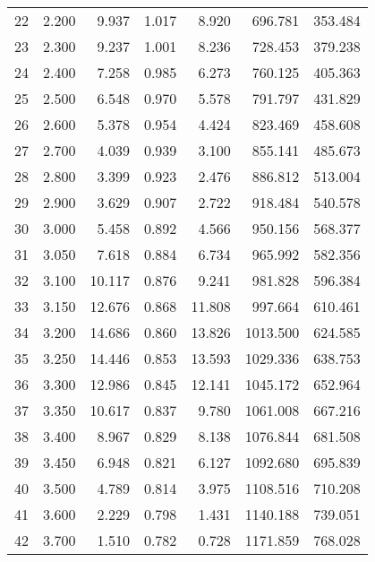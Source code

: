 \begin{table}[H]
\begin{tabular}{rrrrrrr}
22 & 2.200 &   9.937 &  1.017 &      8.920 &     696.781 &   353.484 \\
23 & 2.300 &   9.237 &  1.001 &      8.236 &     728.453 &   379.238 \\
24 & 2.400 &   7.258 &  0.985 &      6.273 &     760.125 &   405.363 \\
25 & 2.500 &   6.548 &  0.970 &      5.578 &     791.797 &   431.829 \\
26 & 2.600 &   5.378 &  0.954 &      4.424 &     823.469 &   458.608 \\
27 & 2.700 &   4.039 &  0.939 &      3.100 &     855.141 &   485.673 \\
28 & 2.800 &   3.399 &  0.923 &      2.476 &     886.812 &   513.004 \\
29 & 2.900 &   3.629 &  0.907 &      2.722 &     918.484 &   540.578 \\
30 & 3.000 &   5.458 &  0.892 &      4.566 &     950.156 &   568.377 \\
31 & 3.050 &   7.618 &  0.884 &      6.734 &     965.992 &   582.356 \\
32 & 3.100 &  10.117 &  0.876 &      9.241 &     981.828 &   596.384 \\
33 & 3.150 &  12.676 &  0.868 &     11.808 &     997.664 &   610.461 \\
34 & 3.200 &  14.686 &  0.860 &     13.826 &    1013.500 &   624.585 \\
35 & 3.250 &  14.446 &  0.853 &     13.593 &    1029.336 &   638.753 \\
36 & 3.300 &  12.986 &  0.845 &     12.141 &    1045.172 &   652.964 \\
37 & 3.350 &  10.617 &  0.837 &      9.780 &    1061.008 &   667.216 \\
38 & 3.400 &   8.967 &  0.829 &      8.138 &    1076.844 &   681.508 \\
39 & 3.450 &   6.948 &  0.821 &      6.127 &    1092.680 &   695.839 \\
40 & 3.500 &   4.789 &  0.814 &      3.975 &    1108.516 &   710.208 \\
41 & 3.600 &   2.229 &  0.798 &      1.431 &    1140.188 &   739.051 \\
42 & 3.700 &   1.510 &  0.782 &      0.728 &    1171.859 &   768.028 \\
\bottomrule
\end{tabular}
\end{table}
